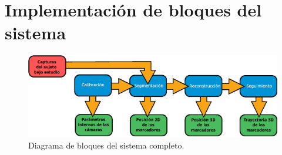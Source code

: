 \section{Implementación de bloques del sistema}



\begin{figure}[H]
\begin{center}
\includegraphics[scale=0.8]{img/Sistema_completo/Diagrama_de_bloques.eps}
\end{center}
\caption{Diagrama de bloques del sistema completo.}
\label{bloquesSist}
\end{figure}



